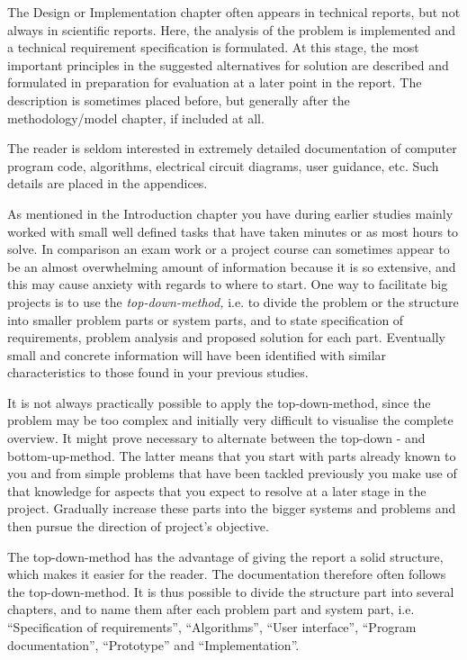 The Design or Implementation chapter often appears in technical
reports, but not always in scientific reports. Here, the analysis of the
problem is implemented and a technical requirement specification is
formulated. At this stage, the most important principles in the suggested
alternatives for solution are described and formulated in preparation for
evaluation at a later point in the report. The description is sometimes
placed before, but generally after the methodology/model chapter, if
included at all.

The reader is seldom interested in extremely detailed documentation of
computer program code, algorithms, electrical circuit diagrams, user
guidance, etc. Such details are placed in the appendices.

As mentioned in the Introduction chapter you have during earlier
studies mainly worked with small well defined tasks that have taken
minutes or as most hours to solve. In comparison an exam work or a
project course can sometimes appear to be an almost overwhelming
amount of information because it is so extensive, and this may cause
anxiety with regards to where to start. One way to facilitate big projects
is to use the \emph{top-down-method,} i.e. to divide the problem or the structure
into smaller problem parts or system parts, and to state specification of
requirements, problem analysis and proposed solution for each part.
Eventually small and concrete information will have been identified
with similar characteristics to those found in your previous studies.

It is not always practically possible to apply the top-down-method, since
the problem may be too complex and initially very difficult to visualise
the complete overview. It might prove necessary to alternate between
the top-down - and bottom-up-method. The latter means that you start
with parts already known to you and from simple problems that have
been tackled previously you make use of that knowledge for aspects
that you expect to resolve at a later stage in the project. Gradually
increase these parts into the bigger systems and problems and then
pursue the direction of project's objective.

The top-down-method has the advantage of giving the report a solid
structure, which makes it easier for the reader. The documentation
therefore often follows the top-down-method. It is thus possible to
divide the structure part into several chapters, and to name them after
each problem part and system part, i.e. “Specification of requirements”,
“Algorithms”, “User interface”, “Program documentation”, “Prototype”
and “Implementation”.  